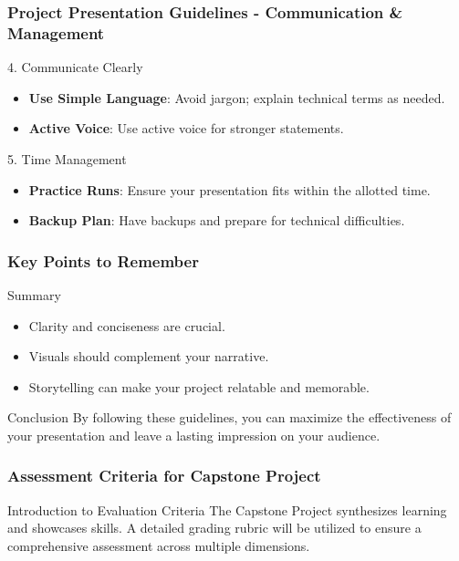 \documentclass[aspectratio=169]{beamer}
\begin{document}
\begin{frame}[fragile]
    \frametitle{Project Presentation Guidelines - Communication & Management}
    \begin{block}{4. Communicate Clearly}
        \begin{itemize}
            \item \textbf{Use Simple Language}: Avoid jargon; explain technical terms as needed.
            \item \textbf{Active Voice}: Use active voice for stronger statements.
        \end{itemize}
    \end{block}

    \begin{block}{5. Time Management}
        \begin{itemize}
            \item \textbf{Practice Runs}: Ensure your presentation fits within the allotted time.
            \item \textbf{Backup Plan}: Have backups and prepare for technical difficulties.
        \end{itemize}
    \end{block}
\end{frame}

\begin{frame}[fragile]
    \frametitle{Key Points to Remember}
    \begin{block}{Summary}
        \begin{itemize}
            \item Clarity and conciseness are crucial.
            \item Visuals should complement your narrative.
            \item Storytelling can make your project relatable and memorable.
        \end{itemize}
    \end{block}

    \begin{block}{Conclusion}
        By following these guidelines, you can maximize the effectiveness of your presentation and leave a lasting impression on your audience.
    \end{block}
\end{frame}

\begin{frame}[fragile]
    \frametitle{Assessment Criteria for Capstone Project}
    \begin{block}{Introduction to Evaluation Criteria}
        The Capstone Project synthesizes learning and showcases skills. A detailed grading rubric will be utilized to ensure a comprehensive assessment across multiple dimensions.
    \end{block}
\end{frame}
\end{document}
